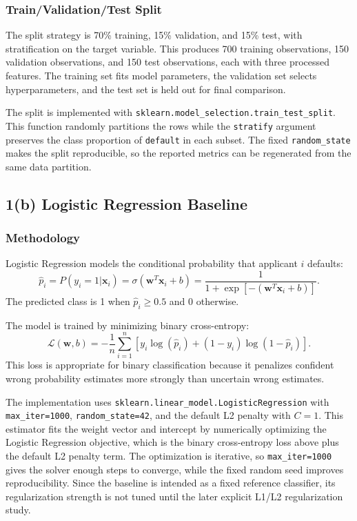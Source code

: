 \documentclass[12pt]{article}
\begin{document}
\subsubsection{Train/Validation/Test Split}

The split strategy is 70\% training, 15\% validation, and 15\% test, with stratification on the target variable. This produces 700 training observations, 150 validation observations, and 150 test observations, each with three processed features. The training set fits model parameters, the validation set selects hyperparameters, and the test set is held out for final comparison.

The split is implemented with \texttt{sklearn.model\_selection.train\_test\_split}. This function randomly partitions the rows while the \texttt{stratify} argument preserves the class proportion of \texttt{default} in each subset. The fixed \texttt{random\_state} makes the split reproducible, so the reported metrics can be regenerated from the same data partition.

\subsection{1(b) Logistic Regression Baseline}

\subsubsection{Methodology}

Logistic Regression models the conditional probability that applicant $i$ defaults:
\[
    \hat{p}_i=P(y_i=1|\mathbf{x}_i)
    =
    \sigma(\mathbf{w}^{T}\mathbf{x}_i+b)
    =
    \frac{1}{1+\exp[-(\mathbf{w}^{T}\mathbf{x}_i+b)]}.
\]
The predicted class is 1 when $\hat{p}_i \geq 0.5$ and 0 otherwise.

The model is trained by minimizing binary cross-entropy:
\[
    \mathcal{L}(\mathbf{w},b)
    =
    -\frac{1}{n}\sum_{i=1}^{n}
    \left[
    y_i\log(\hat{p}_i)+(1-y_i)\log(1-\hat{p}_i)
    \right].
\]
This loss is appropriate for binary classification because it penalizes confident wrong probability estimates more strongly than uncertain wrong estimates.

The implementation uses \texttt{sklearn.linear\_model.LogisticRegression} with \texttt{max\_iter=1000}, \texttt{random\_state=42}, and the default L2 penalty with $C=1$. This estimator fits the weight vector and intercept by numerically optimizing the Logistic Regression objective, which is the binary cross-entropy loss above plus the default L2 penalty term. The optimization is iterative, so \texttt{max\_iter=1000} gives the solver enough steps to converge, while the fixed random seed improves reproducibility. Since the baseline is intended as a fixed reference classifier, its regularization strength is not tuned until the later explicit L1/L2 regularization study.
\end{document}
